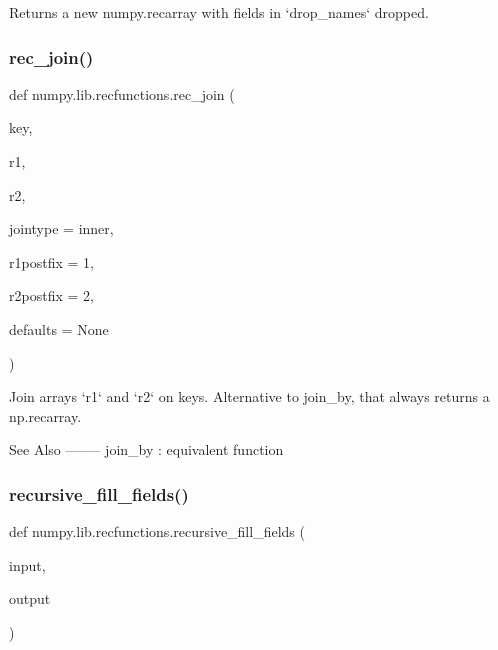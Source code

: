\begin{DoxyVerb}Returns a new numpy.recarray with fields in `drop_names` dropped.
\end{DoxyVerb}
 \mbox{\label{namespacenumpy_1_1lib_1_1recfunctions_a54a0e3181236b7bc9985221ca6763569}} 
\subsubsection{\texorpdfstring{rec\+\_\+join()}{rec\_join()}}
{\footnotesize\ttfamily def numpy.\+lib.\+recfunctions.\+rec\+\_\+join (\begin{DoxyParamCaption}\item[{}]{key,  }\item[{}]{r1,  }\item[{}]{r2,  }\item[{}]{jointype = {\ttfamily \textquotesingle{}inner\textquotesingle{}},  }\item[{}]{r1postfix = {\ttfamily \textquotesingle{}1\textquotesingle{}},  }\item[{}]{r2postfix = {\ttfamily \textquotesingle{}2\textquotesingle{}},  }\item[{}]{defaults = {\ttfamily None} }\end{DoxyParamCaption})}

\begin{DoxyVerb}Join arrays `r1` and `r2` on keys.
Alternative to join_by, that always returns a np.recarray.

See Also
--------
join_by : equivalent function
\end{DoxyVerb}
 \mbox{\label{namespacenumpy_1_1lib_1_1recfunctions_a3a3ab8a90c80d5043f9caf6b04f66e72}} 
\subsubsection{\texorpdfstring{recursive\+\_\+fill\+\_\+fields()}{recursive\_fill\_fields()}}
{\footnotesize\ttfamily def numpy.\+lib.\+recfunctions.\+recursive\+\_\+fill\+\_\+fields (\begin{DoxyParamCaption}\item[{}]{input,  }\item[{}]{output }\end{DoxyParamCaption})}

